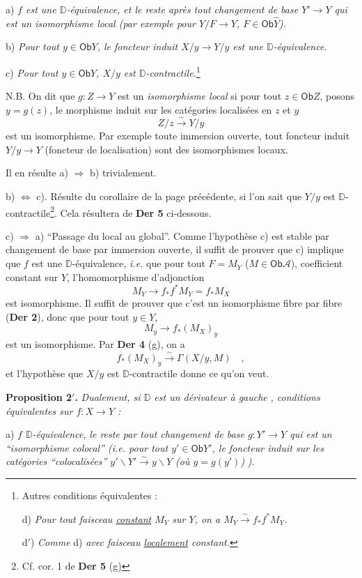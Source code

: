 \documentclass[11pt,leqno]{article}
\newcommand{\msp}[1]{\marginpar{\footnotesize [#1]}}
\newcommand{\DD}{\mathbb{D}}
\newcommand{\cA}{\mathcal{A}}
\newcommand{\Ob}{\mathsf{Ob}}
\newcommand{\isoto}{\overset{\sim}{\to}}
\newcommand{\isolongto}{\overset{\sim}{\longrightarrow}}
\begin{document}
a) \textit{$f$ est une $\DD$-équivalence, et le reste après tout changement de base $Y' \to Y$ qui est un isomorphisme local (par exemple pour $Y/F \to Y$, $F \in \Ob \widehat{Y}$).}

b) \textit{Pour tout $y \in \Ob Y$, le foncteur induit $X/y \to Y/y$ est une $\DD$-équivalence.}

c) \textit{Pour tout $y \in \Ob Y$, $X/y$ est $\DD$-contractile.}\footnote[25]{Autres conditions équivalentes :\par
\indent d) \textit{Pour tout faisceau \underline{constant} $M_Y$ sur $Y$, on a $M_Y \isoto f_*f^*M_Y$.}\par
\indent d$'$) \textit{Comme} d) \textit{avec faisceau \underline{localement} constant.}}

\noindent N.B. On dit que $g : Z \to Y$ est un \textit{isomorphisme local} si pour tout $z \in \Ob Z$, posons $y = g(z)$, le morphisme induit sur les catégories localisées en $z$ et $y$
\[
Z/z \isolongto Y/y
\]
est un isomorphisme. Par exemple toute immersion ouverte, tout foncteur induit $Y/y \to Y$ (foncteur de localisation) sont des isomorphismes locaux.

Il en résulte a) $\Rightarrow$ b) trivialement.

b) $\Leftrightarrow$ c). Résulte du corollaire de la page précédente, si l'on sait que $Y/y$ est $\DD$-contractile\footnote[26]{Cf. cor. 1 de \textbf{Der 5} (g)}. Cela résultera de \textbf{Der 5} ci-dessous.

\noindent\msp{page 64}

c) $\Rightarrow$ a) “Passage du local au global”. Comme l'hypothèse c) est stable par changement de base par immersion ouverte, il suffit de prouver que c) implique que $f$ est une $\DD$-équivalence, \textit{i.e.} que pour tout $F = M_Y$ ($M \in \Ob \cA$), coefficient constant sur $Y$, l'homomorphisme d'adjonction
\[
M_Y \longrightarrow f_*f^*M_Y = f_*M_X
\]
est isomorphisme. Il suffit de prouver que c'est un isomorphisme fibre par fibre (\textbf{Der 2}), donc que pour tout $y \in Y$,
\[
M_y \longrightarrow f_*(M_X)_y
\]
est un isomorphisme. Par \textbf{Der 4} (g), on a
\[
f_*(M_X)_y \isolongto \Gamma(X/y, M) \quad ,
\]
et l'hypothèse que $X/y$ est $\DD$-contractile donne ce qu'on veut.

\noindent\textbf{Proposition 2$'$.} \textit{Dualement, si $\DD$ est un dérivateur à gauche} \textit{, conditions équivalentes sur $f : X \to Y$ :}

a) \textit{$f$ $\DD$-équivalence,} \textit{le reste par tout changement de base $g : Y' \to Y$ qui est un “isomorphisme colocal” (i.e. pour tout $y' \in \Ob Y'$, le foncteur induit sur les catégories “colocalisées” $y'\backslash Y' \isolongto y\backslash Y$ (où $y = g(y')$)} \textit{).}
\end{document}

